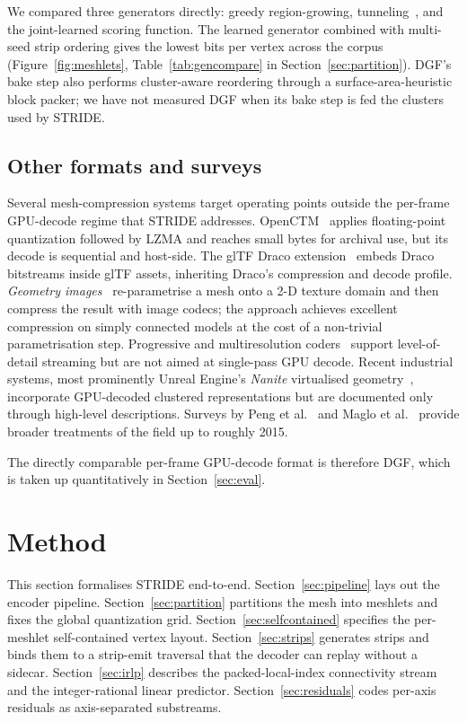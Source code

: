 \documentclass[pdflatex,sn-vancouver-num]{sn-jnl}%
\theoremstyle{thmstyleone}%
\theoremstyle{thmstyletwo}%
\theoremstyle{thmstylethree}%
\begin{document}
We compared three generators directly: greedy region-growing, tunneling~\cite{ref11_stewart_2001}, and the joint-learned scoring function. The learned generator combined with multi-seed strip ordering gives the lowest bits per vertex across the corpus (Figure~\ref{fig:meshlets}, Table~\ref{tab:gencompare} in Section~\ref{sec:partition}). DGF's bake step also performs cluster-aware reordering through a surface-area-heuristic block packer; we have not measured DGF when its bake step is fed the clusters used by STRIDE.

\subsection{Other formats and surveys}

Several mesh-compression systems target operating points outside the per-frame GPU-decode regime that STRIDE addresses. OpenCTM~\cite{ref29_openctm} applies floating-point quantization followed by LZMA and reaches small bytes for archival use, but its decode is sequential and host-side. The glTF Draco extension~\cite{ref30_khr_draco} embeds Draco bitstreams inside glTF assets, inheriting Draco's compression and decode profile. \emph{Geometry images}~\cite{ref31_gu_2002_geometry_images} re-parametrise a mesh onto a 2-D texture domain and then compress the result with image codecs; the approach achieves excellent compression on simply connected models at the cost of a non-trivial parametrisation step. Progressive and multiresolution coders~\cite{ref32_hoppe_1996_progressive,ref33_khodakovsky_2000_progressive} support level-of-detail streaming but are not aimed at single-pass GPU decode. Recent industrial systems, most prominently Unreal Engine's \emph{Nanite} virtualised geometry~\cite{ref34_nanite_2021}, incorporate GPU-decoded clustered representations but are documented only through high-level descriptions. Surveys by Peng et al.~\cite{ref14_peng_2005} and Maglo et al.~\cite{ref15_maglo_2015} provide broader treatments of the field up to roughly 2015.

The directly comparable per-frame GPU-decode format is therefore DGF, which is taken up quantitatively in Section~\ref{sec:eval}.

\section{Method}\label{sec:method}

This section formalises STRIDE end-to-end. Section~\ref{sec:pipeline} lays out the encoder pipeline. Section~\ref{sec:partition} partitions the mesh into meshlets and fixes the global quantization grid. Section~\ref{sec:selfcontained} specifies the per-meshlet self-contained vertex layout. Section~\ref{sec:strips} generates strips and binds them to a strip-emit traversal that the decoder can replay without a sidecar. Section~\ref{sec:irlp} describes the packed-local-index connectivity stream and the integer-rational linear predictor. Section~\ref{sec:residuals} codes per-axis residuals as axis-separated substreams.
\end{document}
